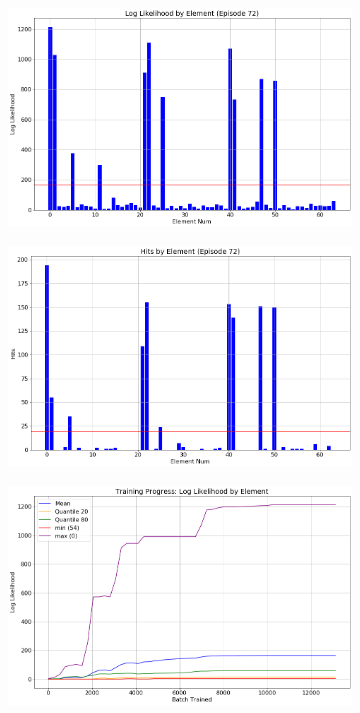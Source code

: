 \begin{figure}[h]
\begin{subfigure}[t]{\subfigwidth\textwidth}
\centering
\includegraphics[width=\linewidth]{../figs/search_known/perturbed_large/log_like.png}
\end{subfigure}
\hfill
\begin{subfigure}[t]{\subfigwidth\textwidth}
\centering
\includegraphics[width=\linewidth]{../figs/search_known/perturbed_large/hits.png}
\end{subfigure}
\medskip
\begin{subfigure}[t]{\subfigwidth\textwidth}
\centering
\includegraphics[width=\linewidth]{../figs/search_known/perturbed_large/learning_curve_log_like.png}

\end{subfigure}
\end{figure}
